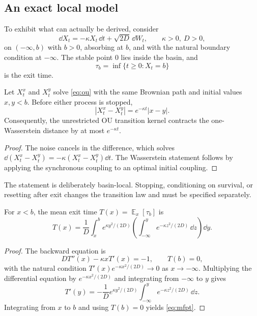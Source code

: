 \documentclass[11pt]{article}
\DeclareMathOperator{\E}{\mathbb E}
\begin{document}
\subsection{An exact local model}

To exhibit what can actually be derived, consider
\begin{equation}\label{eq:ou}
 \dd X_t=-\kappa X_t\,\dd t+\sqrt{2D}\,\dd W_t,
 \qquad \kappa>0,\ D>0,
\end{equation}
on $(-\infty,b)$ with $b>0$, absorbing at $b$, and with the natural
boundary condition at $-\infty$.  The stable point $0$ lies inside the
basin, and
\[
 \tau_b=\inf\{t\geq0:X_t=b\}
\]
is the exit time.

\begin{proposition}
\label{prop:ou-contraction}
Let $X_t^x$ and $X_t^y$ solve \cref{eq:ou} with the same Brownian path
and initial values $x,y<b$.  Before either process is stopped,
\[
 |X_t^x-X_t^y|=e^{-\kappa t}|x-y|.
\]
Consequently, the unrestricted OU transition kernel contracts the
one-Wasserstein distance by at most $e^{-\kappa t}$.
\end{proposition}

\begin{proof}
The noise cancels in the difference, which solves
$\dd(X_t^x-X_t^y)=-\kappa(X_t^x-X_t^y)\dd t$.  The Wasserstein statement
follows by applying the synchronous coupling to an optimal initial
coupling.
\end{proof}

The statement is deliberately basin-local.  Stopping, conditioning on
survival, or resetting after exit changes the transition law and must be
specified separately.

\begin{theorem}\label{thm:mfpt}
For $x<b$, the mean exit time $T(x)=\E_x[\tau_b]$ is
\begin{equation}\label{eq:mfpt}
 T(x)=\frac1D\int_x^b
 e^{\kappa y^2/(2D)}
 \left(\int_{-\infty}^{y}e^{-\kappa z^2/(2D)}\,\dd z\right)\dd y .
\end{equation}
\end{theorem}

\begin{proof}
The backward equation is
\[
 DT''(x)-\kappa xT'(x)=-1,\qquad T(b)=0,
\]
with the natural condition
$T'(x)e^{-\kappa x^2/(2D)}\to0$ as $x\to-\infty$.  Multiplying the
differential equation by $e^{-\kappa x^2/(2D)}$ and integrating from
$-\infty$ to $y$ gives
\[
T'(y)=-\frac1D e^{\kappa y^2/(2D)}
\int_{-\infty}^{y}e^{-\kappa z^2/(2D)}\,\dd z .
\]
Integrating from $x$ to $b$ and using $T(b)=0$ yields
\cref{eq:mfpt}.
\end{proof}
\end{document}
